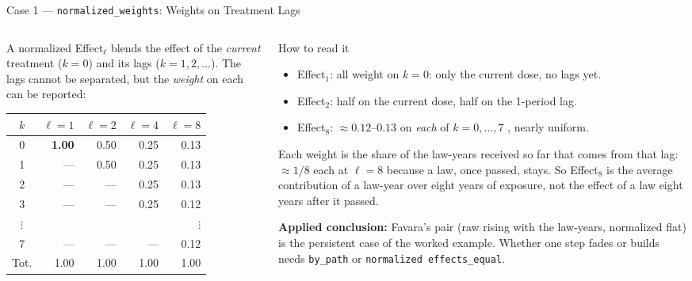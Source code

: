 \documentclass[main.tex]{subfiles}
\begin{document}
\begin{frame}{Case 1 --- \texttt{normalized\_weights}: Weights on Treatment Lags}

  \begin{columns}[T]
    \begin{column}{0.44\textwidth}
      \footnotesize
      A normalized Effect$_\ell$ blends the effect of the \emph{current} treatment
      ($k{=}0$) and its lags ($k{=}1,2,\dots$). The lags cannot be separated, but the
      \emph{weight} on each can be reported:

      \smallskip
      \scriptsize
      \begin{tabular}{@{}crrrr@{}}
        \toprule
        $k$ & $\ell{=}1$ & $\ell{=}2$ & $\ell{=}4$ & $\ell{=}8$ \\
        \midrule
        0 & \textbf{1.00} & 0.50 & 0.25 & 0.13 \\
        1 & ---  & 0.50 & 0.25 & 0.13 \\
        2 & ---  & ---  & 0.25 & 0.13 \\
        3 & ---  & ---  & 0.25 & 0.12 \\
        $\vdots$ &   &   &   & $\vdots$ \\
        7 & ---  & ---  & ---  & 0.12 \\
        \midrule
        Tot. & 1.00 & 1.00 & 1.00 & 1.00 \\
        \bottomrule
      \end{tabular}
    \end{column}
    \begin{column}{0.52\textwidth}
      \begin{block}{How to read it}
        \footnotesize
        \begin{itemize}\footnotesize
          \item Effect$_1$: all weight on $k{=}0$: only the current dose, no lags yet.
          \item Effect$_2$: half on the current dose, half on the 1-period lag.
          \item Effect$_8$: $\approx 0.12$--$0.13$ on \emph{each} of $k{=}0,\dots,7$
            , nearly uniform.
        \end{itemize}
      \end{block}

      \smallskip
      \footnotesize
      Each weight is the share of the law-years received so far that comes from
      that lag: $\approx 1/8$ each at $\ell=8$ because a law, once passed,
      stays. So
      Effect$_8$ is the average contribution of a law-year over eight years of
      exposure, not the effect of a law eight years after it passed.

      \smallskip
      \textbf{Applied conclusion:} Favara's pair (raw rising with the
      law-years, normalized flat) is the persistent case of the worked example.
      Whether one step fades or builds needs \texttt{by\_path} or
      \texttt{normalized effects\_equal}.
    \end{column}
  \end{columns}

\end{frame}
\end{document}
